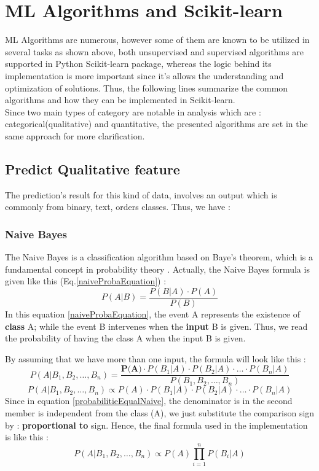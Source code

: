 \documentclass[12pt,a4paper, oneside]{book}
\begin{document}
\section{ML Algorithms and Scikit-learn}  
ML Algorithms are numerous, however some of them are known to be utilized in several tasks as shown above, both unsupervised and supervised algorithms are supported in Python Scikit-learn package, whereas the logic behind its implementation is more important since it's allows the understanding and optimization of solutions. Thus, the following lines summarize the common algorithms and how they can be implemented in Scikit-learn.\\

Since two main types of category are notable in analysis which are : categorical(qualitative) and quantitative, the presented algorithms are set in the same approach for more clarification.

\subsection{Predict Qualitative feature} 
The prediction's result for this kind of data, involves an output which is commonly from binary, text, orders classes. Thus, we have : 
\subsubsection{Naive Bayes} 
The Naive Bayes is a classification algorithm based on Baye's theorem, which is a fundamental concept in probability theory \citep{maria2016performance}. 
Actually, the Naive Bayes formula is given like this (Eq.\ref{naiveProbaEquation}) : 
\begin{equation}
	\label{naiveProbaEquation}
	P(A|B) = \frac{P(B|A)  \cdot  P(A)}{P(B)}
\end{equation}
In this equation \ref{naiveProbaEquation}, the event A represents the existence of \textbf{class} A; while the event B intervenes when the \textbf{input} B is given. Thus, we read the probability of having the class A when the input B is given. 

\noindent By assuming that we have more than one input, the formula will look like this : 
\begin{equation} 
	\label{probabilitieEqualNaive}
	P(A | B_1, B_2, \ldots, B_n) = \frac{\textbf{P(A)} \cdot P(B_1 | A) \cdot P(B_2 | A) \cdot \ldots \cdot P(B_n | A)}{P(B_1, B_2, \ldots, B_n)}
\end{equation}  
\begin{equation}
	P(A | B_1, B_2, \ldots, B_n) \propto P(A) \cdot P(B_1 | A) \cdot P(B_2 | A) \cdot \ldots \cdot P(B_n | A)
\end{equation}
Since in equation \ref{probabilitieEqualNaive}, the denominator is in the second member is independent from the class (A), we just substitute the comparison sign by : \textbf{proportional to} sign. Hence, the final formula used in the implementation is like this :
\begin{equation}
P(A | B_1, B_2, \ldots, B_n) \propto P(A) \prod_{i=1}^{n} P(B_i | A)
\end{equation}
\end{document}
